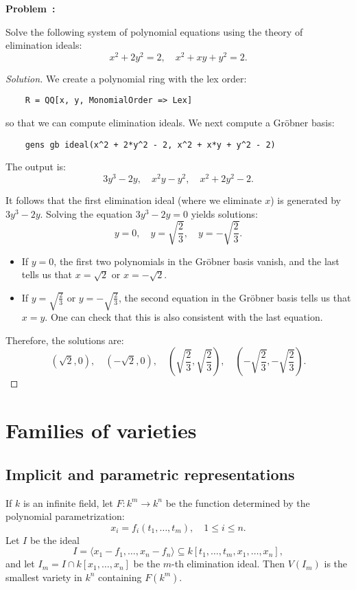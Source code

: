 \documentclass[12pt]{article}
\newcounter{problem}
\newenvironment{problem}[1][Problem]{%
	\refstepcounter{problem}%
	\noindent\textbf{\color{magenta}#1~\theproblem: }%
}{}
\newenvironment{solution}
    {\renewcommand{\qedsymbol}{}\begin{proof}[Solution]}
    {\end{proof}}
\begin{document}
\begin{problem}
Solve the following system of polynomial equations using the theory of elimination ideals:
\[
	x^2 + 2y^2 = 2, \quad x^2 + xy + y^2 = 2.
\]
\end{problem}

\begin{solution}
	We create a polynomial ring with the lex order:
	\begin{verbatim}
    R = QQ[x, y, MonomialOrder => Lex]
    \end{verbatim}
	so that we can compute elimination ideals. We next compute a Gr\"obner basis:
	\begin{verbatim}
    gens gb ideal(x^2 + 2*y^2 - 2, x^2 + x*y + y^2 - 2)
    \end{verbatim}

	The output is:
	\[
		3y^3 - 2y, \quad x^2y - y^2, \quad x^2 + 2y^2 - 2.
	\]

	It follows that the first elimination ideal (where we eliminate \(x\)) is generated by \(3y^3 - 2y\). Solving the equation \(3y^3 - 2y = 0\) yields solutions:
	\[
		y = 0, \quad y = \sqrt{\frac{2}{3}}, \quad y = -\sqrt{\frac{2}{3}}.
	\]

	\begin{itemize}
		\item If \(y = 0\), the first two polynomials in the Gr\"obner basis vanish, and the last tells us that \(x = \sqrt{2}\) or \(x = -\sqrt{2}\).
		\item If \(y = \sqrt{\frac{2}{3}}\) or \(y = -\sqrt{\frac{2}{3}}\), the second equation in the Gr\"obner basis tells us that \(x = y\). One can check that this is also consistent with the last equation.
	\end{itemize}

	Therefore, the solutions are:
	\[
		(\sqrt{2}, 0), \quad (-\sqrt{2}, 0), \quad \left(\sqrt{\frac{2}{3}}, \sqrt{\frac{2}{3}}\right), \quad \left(-\sqrt{\frac{2}{3}}, -\sqrt{\frac{2}{3}}\right).
	\]
\end{solution}

\section{Families of varieties}
\subsection{Implicit and parametric representations}
\begin{theorem}
	If \( k \) is an infinite field, let \( F : k^m \to k^n \) be the function determined by the polynomial parametrization:
	\[
		x_i = f_i(t_1, \ldots, t_m), \quad 1 \leq i \leq n.
	\]
	Let \( I \) be the ideal
	\[
		I = \langle x_1 - f_1, \ldots, x_n - f_n \rangle \subseteq k[t_1, \ldots, t_m, x_1, \ldots, x_n],
	\]
	and let \( I_m = I \cap k[x_1, \ldots, x_n] \) be the \( m \)-th elimination ideal. Then \( V(I_m) \) is the smallest variety in \( k^n \) containing \( F(k^m) \).
\end{theorem}
\end{document}
